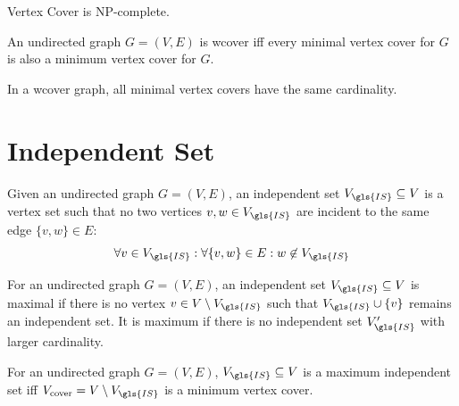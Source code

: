 
\begin{theorem}
  Vertex Cover is NP-complete. \cite{karp_np_complete}
\end{theorem}


\begin{definition}
  \label{def:well_covered}
  An undirected graph \(G=(V,E)\) is \gls{wcover} iff every minimal
  vertex cover for \(G\) is also a minimum vertex cover for \(G\).
  \cite{graph_well_covered}
\end{definition}


\begin{theorem}
  In a \gls{wcover} graph, all minimal vertex covers have the same
  cardinality. \cite{graph_well_covered}
\end{theorem}

\section{Independent Set}


\begin{definition}[\gls{IS}]
  Given an undirected graph \(G=(V,E)\), an independent set
  \(V_{\gls{IS}} \subseteq V\) is a vertex set such that no two
  vertices \(v,w \in V_{\gls{IS}}\) are incident to the same edge 
  \(\{v,w\} \in E\):
  \[
    \forall v \in V_{\gls{IS}}:
    \forall \{v,w\} \in E:
    w \not\in V_{\gls{IS}}
  \]
\end{definition}


\begin{definition}
  For an undirected graph \(G=(V,E)\), an independent set
  \(V_{\gls{IS}}\subseteq V\) is maximal if there is no vertex
  \(v \in V\setminus V_{\gls{IS}}\) such that
  \(V_{\gls{IS}} \cup \{v\}\) remains an independent set. It is
  maximum if there is no independent set \(V_{\gls{IS}}'\) with
  larger cardinality.
\end{definition}


\begin{theorem}
  For an undirected graph \(G=(V,E)\), \(V_{\gls{IS}} \subseteq V\)
  is a maximum independent set iff
  \(V_{\text{cover}} = V \setminus V_{\gls{IS}}\) is a minimum vertex
  cover.
\end{theorem}

